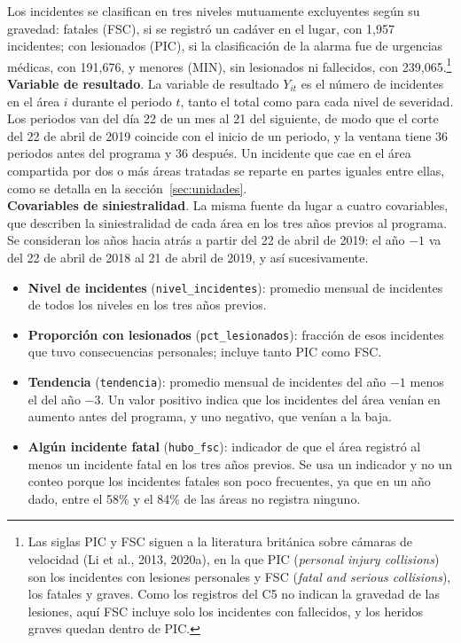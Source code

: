 Los incidentes se clasifican en tres niveles mutuamente excluyentes según su gravedad: fatales (FSC), si se registró un cadáver en el lugar, con 1,957 incidentes; con lesionados (PIC), si la clasificación de la alarma fue de urgencias médicas, con 191,676, y menores (MIN), sin lesionados ni fallecidos, con 239,065.\footnote{Las siglas PIC y FSC siguen a la literatura británica sobre cámaras de velocidad (Li et al., 2013, 2020a), en la que PIC (\emph{personal injury collisions}) son los incidentes con lesiones personales y FSC (\emph{fatal and serious collisions}), los fatales y graves. Como los registros del C5 no indican la gravedad de las lesiones, aquí FSC incluye solo los incidentes con fallecidos, y los heridos graves quedan dentro de PIC.}\\

\textbf{Variable de resultado}. La variable de resultado $Y_{it}$ es el número de incidentes en el área $i$ durante el periodo $t$, tanto el total como para cada nivel de severidad. Los periodos van del día 22 de un mes al 21 del siguiente, de modo que el corte del 22 de abril de 2019 coincide con el inicio de un periodo, y la ventana tiene 36 periodos antes del programa y 36 después. Un incidente que cae en el área compartida por dos o más áreas tratadas se reparte en partes iguales entre ellas, como se detalla en la sección~\ref{sec:unidades}.\\

\textbf{Covariables de siniestralidad}. La misma fuente da lugar a cuatro covariables, que describen la siniestralidad de cada área en los tres años previos al programa. Se consideran los años hacia atrás a partir del 22 de abril de 2019: el año $-1$ va del 22 de abril de 2018 al 21 de abril de 2019, y así sucesivamente.

\begin{itemize}
    \item \textbf{Nivel de incidentes} (\texttt{nivel\_incidentes}): promedio mensual de incidentes de todos los niveles en los tres años previos.
    \item \textbf{Proporción con lesionados} (\texttt{pct\_lesionados}): fracción de esos incidentes que tuvo consecuencias personales; incluye tanto PIC como FSC.
    \item \textbf{Tendencia} (\texttt{tendencia}): promedio mensual de incidentes del año $-1$ menos el del año $-3$. Un valor positivo indica que los incidentes del área venían en aumento antes del programa, y uno negativo, que venían a la baja.
    \item \textbf{Algún incidente fatal} (\texttt{hubo\_fsc}): indicador de que el área registró al menos un incidente fatal en los tres años previos. Se usa un indicador y no un conteo porque los incidentes fatales son poco frecuentes, ya que en un año dado, entre el 58\% y el 84\% de las áreas no registra ninguno.
\end{itemize}

